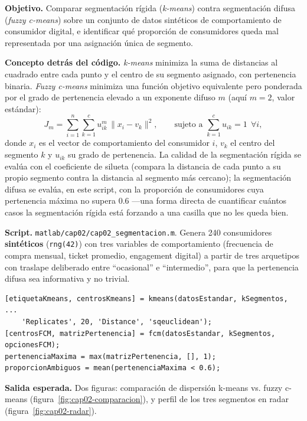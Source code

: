 \begin{cajaLaboratorio}
\textbf{Objetivo.} Comparar segmentación rígida (\textit{k-means}) contra
segmentación difusa (\textit{fuzzy c-means}) sobre un conjunto de datos
sintéticos de comportamiento de consumidor digital, e identificar qué
proporción de consumidores queda mal representada por una asignación única
de segmento.

\textbf{Concepto detrás del código.} \textit{k-means} minimiza la suma de
distancias al cuadrado entre cada punto y el centro de su segmento asignado,
con pertenencia binaria. \textit{Fuzzy c-means} minimiza una función
objetivo equivalente pero ponderada por el grado de pertenencia elevado a un
exponente difuso $m$ (aquí $m=2$, valor estándar):
\[
  J_m = \sum_{i=1}^{n}\sum_{k=1}^{c} u_{ik}^{m}\, \lVert x_i - v_k \rVert^2,
  \qquad \text{sujeto a } \sum_{k=1}^{c} u_{ik} = 1 \ \ \forall i,
\]
donde $x_i$ es el vector de comportamiento del consumidor $i$, $v_k$ el
centro del segmento $k$ y $u_{ik}$ su grado de pertenencia. La calidad de la
segmentación rígida se evalúa con el coeficiente de silueta (compara la
distancia de cada punto a su propio segmento contra la distancia al segmento
más cercano); la segmentación difusa se evalúa, en este script, con la
proporción de consumidores cuya pertenencia máxima no supera 0.6 —una forma
directa de cuantificar cuántos casos la segmentación rígida está forzando a
una casilla que no les queda bien.

\textbf{Script.} \texttt{matlab/cap02/cap02\_segmentacion.m}. Genera 240
consumidores \textbf{sintéticos} (\texttt{rng(42)}) con tres variables de
comportamiento (frecuencia de compra mensual, ticket promedio, engagement
digital) a partir de tres arquetipos con traslape deliberado entre
\enquote{ocasional} e \enquote{intermedio}, para que la pertenencia difusa sea
informativa y no trivial.

\begin{lstlisting}[style=MATLABStyle, caption={Segmentación rígida y difusa (extracto de \texttt{cap02\_segmentacion.m}).}]
[etiquetaKmeans, centrosKmeans] = kmeans(datosEstandar, kSegmentos, ...
    'Replicates', 20, 'Distance', 'sqeuclidean');
[centrosFCM, matrizPertenencia] = fcm(datosEstandar, kSegmentos, opcionesFCM);
pertenenciaMaxima = max(matrizPertenencia, [], 1);
proporcionAmbiguos = mean(pertenenciaMaxima < 0.6);
\end{lstlisting}

\textbf{Salida esperada.} Dos figuras: comparación de dispersión k-means vs.
fuzzy c-means (figura~\ref{fig:cap02-comparacion}), y perfil de los tres
segmentos en radar (figura~\ref{fig:cap02-radar}).


\end{cajaLaboratorio}
